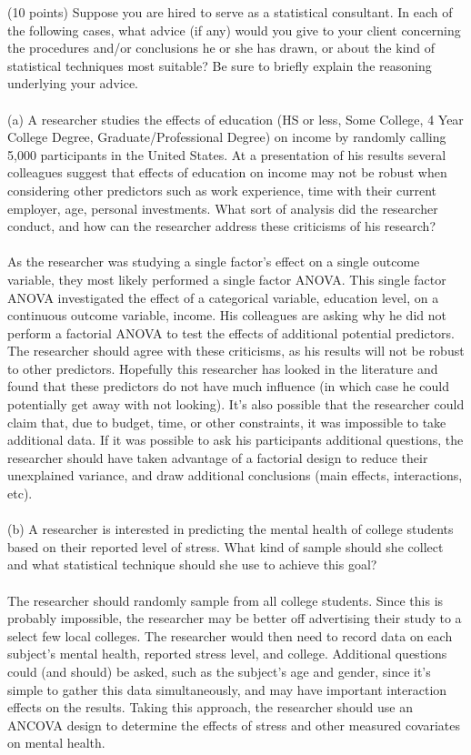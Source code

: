 \documentclass[onecolumn,10pt]{jhwhw}
\begin{document}
\clearpage
\problem{}
(10 points) Suppose you are hired to serve as a statistical consultant. In each of the following cases, what advice (if any) would you give to your client concerning the procedures and/or conclusions he or she has drawn, or about the kind of statistical techniques most suitable? Be sure to briefly explain the reasoning underlying your advice.\\
\\
(a) A researcher studies the effects of education (HS or less, Some College, 4 Year College Degree, Graduate/Professional Degree) on income by randomly calling 5,000 participants in the United States. At a presentation of his results several colleagues suggest that effects of education on income may not be robust when considering other predictors such as work experience, time with their current employer, age, personal investments. What sort of analysis did the researcher conduct, and how can the researcher address these criticisms of his research?\\
\\
As the researcher was studying a single factor's effect on a single outcome variable, they most likely performed a single factor ANOVA. This single factor ANOVA investigated the effect of a categorical variable, education level, on a continuous outcome variable, income. His colleagues are asking why he did not perform a factorial ANOVA to test the effects of additional potential predictors. The researcher should agree with these criticisms, as his results will not be robust to other predictors. Hopefully this researcher has looked in the literature and found that these predictors do not have much influence (in which case he could potentially get away with not looking). It's also possible that the researcher could claim that, due to budget, time, or other constraints, it was impossible to take additional data. If it was possible to ask his participants additional questions, the researcher should have taken advantage of a factorial design to reduce their unexplained variance, and draw additional conclusions (main effects, interactions, etc).\\
\\
(b) A researcher is interested in predicting the mental health of college students based on their reported level of stress. What kind of sample should she collect and what statistical technique should she use to achieve this goal?\\
\\
The researcher should randomly sample from all college students. Since this is probably impossible, the researcher may be better off advertising their study to a select few local colleges. The researcher would then need to record data on each subject's mental health, reported stress level, and college. Additional questions could (and should) be asked, such as the subject's age and gender, since it's simple to gather this data simultaneously, and may have important interaction effects on the results. Taking this approach, the researcher should use an ANCOVA design to determine the effects of stress and other measured covariates on mental health.\\
\end{document}
